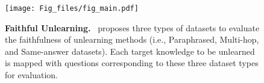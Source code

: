 \begin{figure}[t]
    \centering%
    \centerline{\texttt{[image: Fig\_files/fig\_main.pdf]}}
    \vspace{-0.2cm}
    \caption{\textbf{Faithful Unlearning.} \ourdata~proposes three types of datasets to evaluate the faithfulness of unlearning methods (i.e., Paraphrased, Multi-hop, and Same-answer datasets). Each target knowledge to be unlearned is mapped with questions corresponding to these three dataset types for evaluation.}
    \vspace{-0.4cm}
    \label{fig:main}
\end{figure}


